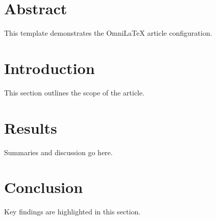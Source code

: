 \documentclass[
    language=english,
    doctype=article,
    institution=none,
    titlestyle=book,
]{../../omnilatex}
\begin{document}
\maketitle

\section*{Abstract}
This template demonstrates the OmniLaTeX article configuration.

\tableofcontents

\section{Introduction}
This section outlines the scope of the article.

\section{Results}
Summaries and discussion go here.

\section{Conclusion}
Key findings are highlighted in this section.

\printbibliography
\end{document}
